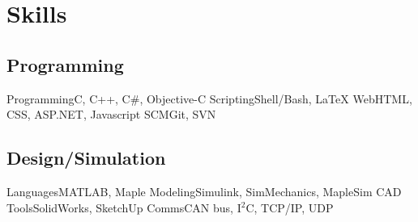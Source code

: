\section{Skills}

\subsection
	{Programming}
\cvcomputer
	{Programming}{C, C++, C\#, Objective-C}
    {Scripting}{Shell/Bash, \LaTeX{}}
\cvcomputer
	{Web}{HTML, CSS, ASP.NET, Javascript}
	{SCM}{Git, SVN}
    
\subsection
	{Design/Simulation}
\cvcomputer
	{Languages}{MATLAB, Maple}
	{Modeling}{Simulink, SimMechanics, MapleSim}
\cvcomputer
	{CAD Tools}{SolidWorks, SketchUp}
	{Comms}{CAN bus, I$^2$C, TCP/IP, UDP}
